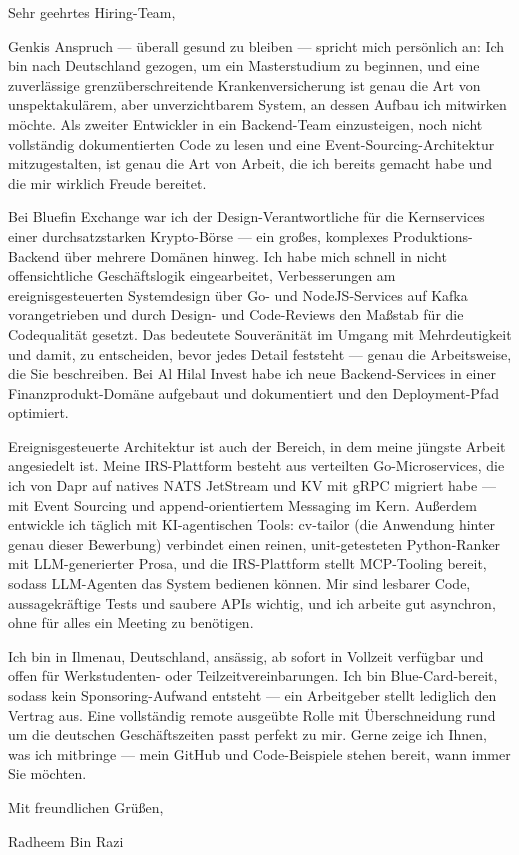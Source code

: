 \documentclass[11pt,a4paper]{coverletter}
\begin{document}
\opening{Sehr geehrtes Hiring-Team,}

Genkis Anspruch — überall gesund zu bleiben — spricht mich persönlich an: Ich bin nach Deutschland gezogen, um ein Masterstudium zu beginnen, und eine zuverlässige grenzüberschreitende Krankenversicherung ist genau die Art von unspektakulärem, aber unverzichtbarem System, an dessen Aufbau ich mitwirken möchte. Als zweiter Entwickler in ein Backend-Team einzusteigen, noch nicht vollständig dokumentierten Code zu lesen und eine Event-Sourcing-Architektur mitzugestalten, ist genau die Art von Arbeit, die ich bereits gemacht habe und die mir wirklich Freude bereitet.

Bei Bluefin Exchange war ich der Design-Verantwortliche für die Kernservices einer durchsatzstarken Krypto-Börse — ein großes, komplexes Produktions-Backend über mehrere Domänen hinweg. Ich habe mich schnell in nicht offensichtliche Geschäftslogik eingearbeitet, Verbesserungen am ereignisgesteuerten Systemdesign über Go- und NodeJS-Services auf Kafka vorangetrieben und durch Design- und Code-Reviews den Maßstab für die Codequalität gesetzt. Das bedeutete Souveränität im Umgang mit Mehrdeutigkeit und damit, zu entscheiden, bevor jedes Detail feststeht — genau die Arbeitsweise, die Sie beschreiben. Bei Al Hilal Invest habe ich neue Backend-Services in einer Finanzprodukt-Domäne aufgebaut und dokumentiert und den Deployment-Pfad optimiert.

Ereignisgesteuerte Architektur ist auch der Bereich, in dem meine jüngste Arbeit angesiedelt ist. Meine IRS-Plattform besteht aus verteilten Go-Microservices, die ich von Dapr auf natives NATS JetStream und KV mit gRPC migriert habe — mit Event Sourcing und append-orientiertem Messaging im Kern. Außerdem entwickle ich täglich mit KI-agentischen Tools: cv-tailor (die Anwendung hinter genau dieser Bewerbung) verbindet einen reinen, unit-getesteten Python-Ranker mit LLM-generierter Prosa, und die IRS-Plattform stellt MCP-Tooling bereit, sodass LLM-Agenten das System bedienen können. Mir sind lesbarer Code, aussagekräftige Tests und saubere APIs wichtig, und ich arbeite gut asynchron, ohne für alles ein Meeting zu benötigen.

Ich bin in Ilmenau, Deutschland, ansässig, ab sofort in Vollzeit verfügbar und offen für Werkstudenten- oder Teilzeitvereinbarungen. Ich bin Blue-Card-bereit, sodass kein Sponsoring-Aufwand entsteht — ein Arbeitgeber stellt lediglich den Vertrag aus. Eine vollständig remote ausgeübte Rolle mit Überschneidung rund um die deutschen Geschäftszeiten passt perfekt zu mir. Gerne zeige ich Ihnen, was ich mitbringe — mein GitHub und Code-Beispiele stehen bereit, wann immer Sie möchten.

\closing{Mit freundlichen Grüßen,}{Radheem Bin Razi}
\end{document}
